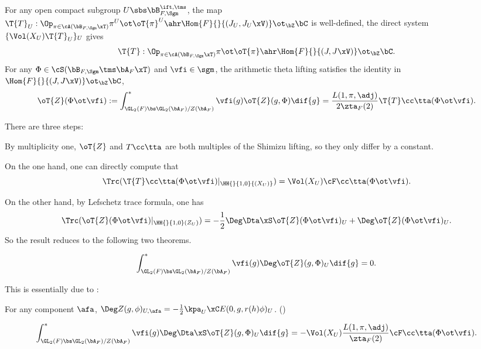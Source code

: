 \documentclass[article, a4paper, twoside]{universal}
\begin{document}
\begin{thm}\label{thm:arithmetic-theta-lift}
    For any open compact subgroup $U\sbs\bB_{F,\Sgm}^{\ift,\tms}$, the map $\T{T}_{U}:\Op_{\pi\in\cA(\bB_{F,\Sgm}\xT)}\pi^{U}\ot\oT{\pi}^{U}\ahr\Hom{F}{}{(J_{U},J_{U}\xV)}\ot_{\bZ}\bC$ is well-defined, the direct system $\{\Vol(X_{U})\T{T}_{U}\}_{U}$ gives
    \[
        \T{T}:\Op_{\pi\in\cA(\bB_{F,\Sgm}\xT)}\pi\ot\oT{\pi}\ahr\Hom{F}{}{(J,J\xV)}\ot_{\bZ}\bC.
    \]
    For any $\Phi\in\cS(\bB_{F,\Sgm}\tms\bA_{F}\xT)$ and $\vfi\in\sgm$, the arithmetic theta lifting satisfies the identity in $\Hom{F}{}{(J,J\xV)}\ot_{\bZ}\bC$,
    \[
        \oT{Z}(\Phi\ot\vfi):=\int_{\GL_{2}(F)\bs\GL_{2}(\bA_{F})/Z(\bA_{F})}^{*}\vfi(g)\oT{Z}(g,\Phi)\dif{g}=\frac{L(1,\pi,\adj)}{2\zta_{F}(2)}\T{T}\cc\tta(\Phi\ot\vfi).
    \]
\end{thm}

\begin{prf}
    There are three steps:

    By multiplicity one, $\oT{Z}$ and $T\cc\tta$ are both multiples of the Shimizu lifting, so they only differ by a constant.

    On the one hand, one can directly compute that
    \[
        \Trc(\T{T}\cc\tta(\Phi\ot\vfi)|_{\HH{}{1,0}{(X_{U})}})=\Vol(X_{U})\cF\cc\tta(\Phi\ot\vfi).
    \]

    On the other hand, by Lefschetz trace formula, one has
    \[
        \Trc(\oT{Z}(\Phi\ot\vfi)|_{\HH{}{1,0}(Z_{U})})=-\frac{1}{2}\Deg\Dta\xS\oT{Z}(\Phi\ot\vfi)_{U}+\Deg\oT{Z}(\Phi\ot\vfi)_{U}.
    \]
    So the result reduces to the following two theorems.
\end{prf}


\begin{thm}
    \[
        \int_{\GL_{2}(F)\bs\GL_{2}(\bA_{F})/Z(\bA_{F})}^{*}\vfi(g)\Deg\oT{Z}(g,\Phi)_{U}\dif{g}=0.
    \]
\end{thm}

\begin{rmk}
    This is essentially due to \cite[Proposition~4.2]{YZZ2013}:

    For any component $\afa$, $\Deg Z(g,\phi)_{U,\afa}=-\frac{1}{2}\kpa_{U}\xC E(0,g,r(h)\phi)_{U}$. ()
\end{rmk}

\begin{thm}
    \[
        \int_{\GL_{2}(F)\bs\GL_{2}(\bA_{F})/Z(\bA_{F})}^{*}\vfi(g)\Deg\Dta\xS\oT{Z}(g,\Phi)_{U}\dif{g}=-\Vol(X_{U})\frac{L(1,\pi,\adj)}{\zta_{F}(2)}\cF\cc\tta(\Phi\ot\vfi).
    \]
\end{thm}
\end{document}
